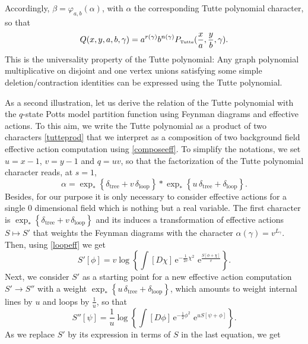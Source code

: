 \documentclass[10pt,here,feynmf]{article}
\begin{document}
Accordingly, $\beta=\varphi_{a,b}(\alpha)$, with $\alpha$ the corresponding Tutte polynomial character, so that
\begin{equation}
Q(x,y,a,b,\gamma)=a^{r(\gamma)}b^{n(\gamma)}P_{\mbox{\tiny Tutte}}(\frac{x}{a},\frac{y}{b},\gamma).
\end{equation}
This is the universality property of the Tutte polynomial: Any graph polynomial multiplicative on disjoint and one vertex unions satisfying some simple deletion/contraction identities can be expressed using the Tutte polynomial.  


As a second illustration, let us derive the relation of the Tutte polynomial with the $q$-state Potts model partition function using Feynman diagrams and effective actions. To this aim, we write the Tutte polynomial as a product of two characters \eqref{tutteprod} that we interpret as a composition of two background field effective action computation using \eqref{composeeff}. To simplify the notations, we set $u=x-1$, $v=y-1$ and $q=uv$, so that the factorization of the Tutte polynomial character reads, at $s=1$,
\begin{equation}
\alpha=\exp_{\ast}\left\{\delta_{\mathrm{tree}}+v\,\delta_{\mathrm{loop}}\right\}\ast
\exp_{\ast}\left\{u\,\delta_{\mathrm{tree}}+\delta_{\mathrm{loop}}\right\}.
\end{equation}
 Besides, for our purpose it is only necessary to consider  effective actions for a single 0 dimensional field which is nothing but a real variable. The first character is  $\exp_{\ast}\left\{\delta_{\mathrm{tree}}+v\,\delta_{\mathrm{loop}}\right\}$ and its induces a transformation of effective actions $S\mapsto S'$ that weights the Feynman diagrams with the character $\alpha(\gamma)=v^{L_{\gamma}}$. Then, using \eqref{loopeff} we get
\begin{equation}
S'[\phi]=v\log\left\{
\int[D\chi]\,\mathrm{e}^{-\frac{1}{2v}\chi^{2}}\,
\,\mathrm{e}^{\frac{S[\phi+\chi]}{v}}
\right\}.
\end{equation} 
Next, we consider $S'$ as a starting point for a new effective action computation $S'\rightarrow S''$ with a weight $\exp_{\ast}\left\{u\,\delta_{\mathrm{tree}}+\delta_{\mathrm{loop}}\right\}$, which amounts to weight internal lines by $u$ and loops by $\frac{1}{u}$, so that
\begin{equation}
S''[\psi]=\frac{1}{u}\log\left\{
\int[D\phi]\,\mathrm{e}^{-\frac{1}{2}\phi^{2}}\,
\,\mathrm{e}^{uS[\psi+\phi]}
\right\}.
\end{equation} 
As we replace $S'$ by its expression in terms of $S$ in the last equation, we get
\end{document}
